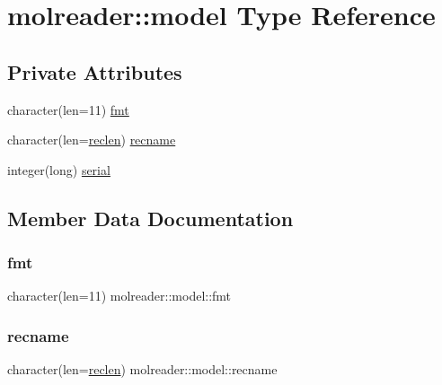 \hypertarget{structmolreader_1_1model}{}\section{molreader\+:\+:model Type Reference}
\label{structmolreader_1_1model}
\subsection*{Private Attributes}
\begin{DoxyCompactItemize}
\item 
character(len=11) \hyperlink{structmolreader_1_1model_a23b8930632b27e87549d8b297f827fd6}{fmt}
\item 
character(len=\hyperlink{namespacemolreader_a8f12be3272b946fd698c9fbaf2ba9d32}{reclen}) \hyperlink{structmolreader_1_1model_abac2ce11a9e639f8e2c4b29e40e87298}{recname}
\item 
integer(long) \hyperlink{structmolreader_1_1model_aff0c60ac8af22248ab65fa453bf87e6a}{serial}
\end{DoxyCompactItemize}


\subsection{Member Data Documentation}
\mbox{\label{structmolreader_1_1model_a23b8930632b27e87549d8b297f827fd6}} 
\subsubsection{\texorpdfstring{fmt}{fmt}}
{\footnotesize\ttfamily character(len=11) molreader\+::model\+::fmt\hspace{0.3cm}{\ttfamily [private]}}

\mbox{\label{structmolreader_1_1model_abac2ce11a9e639f8e2c4b29e40e87298}} 
\subsubsection{\texorpdfstring{recname}{recname}}
{\footnotesize\ttfamily character(len=\hyperlink{namespacemolreader_a8f12be3272b946fd698c9fbaf2ba9d32}{reclen}) molreader\+::model\+::recname\hspace{0.3cm}{\ttfamily [private]}}

